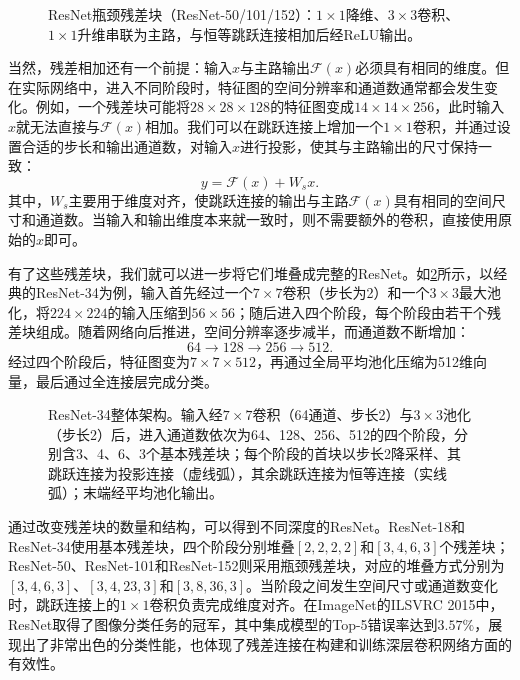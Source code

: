 \begin{figure}[H]
    \caption{ResNet瓶颈残差块（ResNet-50/101/152）：$1\times 1$降维、$3\times 3$卷积、$1\times 1$升维串联为主路，与恒等跳跃连接相加后经ReLU输出。}
    \label{fig:residual_bottleneck}
\end{figure}

当然，残差相加还有一个前提：输入$x$与主路输出$\mathcal{F}(x)$必须具有相同的维度。但在实际网络中，进入不同阶段时，特征图的空间分辨率和通道数通常都会发生变化。例如，一个残差块可能将$28\times28\times128$的特征图变成$14\times14\times256$，此时输入$x$就无法直接与$\mathcal{F}(x)$相加。我们可以在跳跃连接上增加一个$1\times1$卷积，并通过设置合适的步长和输出通道数，对输入$x$进行投影，使其与主路输出的尺寸保持一致：
$$
y=\mathcal{F}(x)+W_sx.
$$
其中，$W_s$主要用于维度对齐，使跳跃连接的输出与主路$\mathcal{F}(x)$具有相同的空间尺寸和通道数。当输入和输出维度本来就一致时，则不需要额外的卷积，直接使用原始的$x$即可。

有了这些残差块，我们就可以进一步将它们堆叠成完整的ResNet。如\cref{fig:resnet}所示，以经典的ResNet-34为例，输入首先经过一个$7\times7$卷积（步长为2）和一个$3\times3$最大池化，将$224\times224$的输入压缩到$56\times56$；随后进入四个阶段，每个阶段由若干个残差块组成。随着网络向后推进，空间分辨率逐步减半，而通道数不断增加：
$$
64\rightarrow128\rightarrow256\rightarrow512.
$$
经过四个阶段后，特征图变为$7\times7\times512$，再通过全局平均池化压缩为512维向量，最后通过全连接层完成分类。

\begin{figure}[H]
    \caption{ResNet-34整体架构。输入经$7\times 7$卷积（64通道、步长2）与$3\times 3$池化（步长2）后，进入通道数依次为64、128、256、512的四个阶段，分别含3、4、6、3个基本残差块；每个阶段的首块以步长2降采样、其跳跃连接为投影连接（虚线弧），其余跳跃连接为恒等连接（实线弧）；末端经平均池化输出。}
    \label{fig:resnet}
\end{figure}

通过改变残差块的数量和结构，可以得到不同深度的ResNet。ResNet-18和ResNet-34使用基本残差块，四个阶段分别堆叠$[2,2,2,2]$和$[3,4,6,3]$个残差块；ResNet-50、ResNet-101和ResNet-152则采用瓶颈残差块，对应的堆叠方式分别为$[3,4,6,3]$、$[3,4,23,3]$和$[3,8,36,3]$。当阶段之间发生空间尺寸或通道数变化时，跳跃连接上的$1\times1$卷积负责完成维度对齐。在ImageNet的ILSVRC 2015中，ResNet取得了图像分类任务的冠军，其中集成模型的Top-5错误率达到$3.57\%$，展现出了非常出色的分类性能，也体现了残差连接在构建和训练深层卷积网络方面的有效性。

